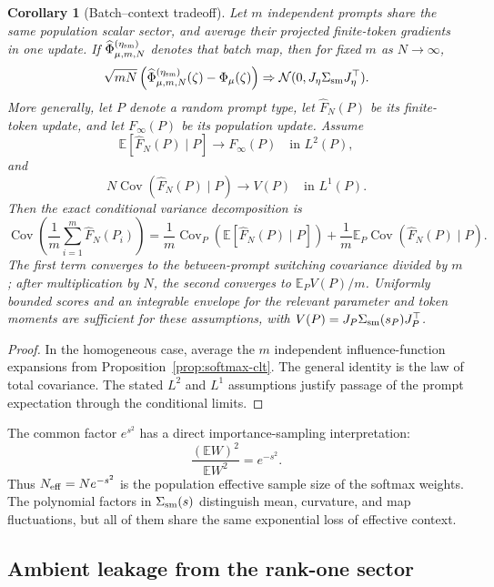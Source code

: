 \documentclass[11pt]{article}
\newtheorem{corollary}[theorem]{Corollary}
\newcommand{\E}{\mathbb E}
\begin{document}
\begin{corollary}[Batch--context tradeoff]
\label{cor:softmax-batch-context}
Let \(m\) independent prompts share the same population scalar sector, and
average their projected finite-token gradients in one update.  If
\(\widehat\Phi_{\mu,m,N}^{(\eta_{\rm sm})}\) denotes that batch map, then
for fixed \(m\) as \(N\to\infty\),
\[
\sqrt{mN}\left(
\widehat\Phi_{\mu,m,N}^{(\eta_{\rm sm})}(\zeta)
-\Phi_\mu(\zeta)\right)
\Rightarrow
\mathcal N(0,J_\eta\Sigma_{\rm sm}J_\eta^\top).
\]
More generally, let \(P\) denote a random prompt type, let
\(\widehat F_N(P)\) be its finite-token update, and let \(F_\infty(P)\) be
its population update.  Assume
\[
\E[\widehat F_N(P)\mid P]\to F_\infty(P)
\quad\text{in }L^2(P),
\]
and
\[
N\operatorname{Cov}(\widehat F_N(P)\mid P)
\to V(P)
\quad\text{in }L^1(P).
\]
Then the exact conditional variance decomposition is
\[
\operatorname{Cov}\!\left(\frac1m\sum_{i=1}^m\widehat F_N(P_i)\right)
=
\frac1m\operatorname{Cov}_P\!\left(\E[
\widehat F_N(P)\mid P]\right)
+\frac1m\E_P\operatorname{Cov}\!\left(
\widehat F_N(P)\mid P\right).
\]
The first term converges to the between-prompt switching covariance divided
by \(m\); after multiplication by \(N\), the second converges to
\(\E_P V(P)/m\).  Uniformly bounded scores and an integrable envelope for
the relevant parameter and token moments are sufficient for these
assumptions, with
\(V(P)=J_P\Sigma_{\rm sm}(s_P)J_P^\top\).
\end{corollary}

\begin{proof}
In the homogeneous case, average the \(m\) independent influence-function
expansions from Proposition~\ref{prop:softmax-clt}.  The general identity is
the law of total covariance.  The stated \(L^2\) and \(L^1\) assumptions
justify passage of the prompt expectation through the conditional limits.
\end{proof}

The common factor \(e^{s^2}\) has a direct importance-sampling
interpretation:
\[
\frac{(\E W)^2}{\E W^2}=e^{-s^2}.
\]
Thus \(N_{\rm eff}=Ne^{-s^2}\) is the population effective sample size of
the softmax weights.  The polynomial factors in
\(\Sigma_{\rm sm}(s)\) distinguish mean, curvature, and map fluctuations,
but all of them share the same exponential loss of effective context.

\subsection{Ambient leakage from the rank-one sector}
\end{document}
